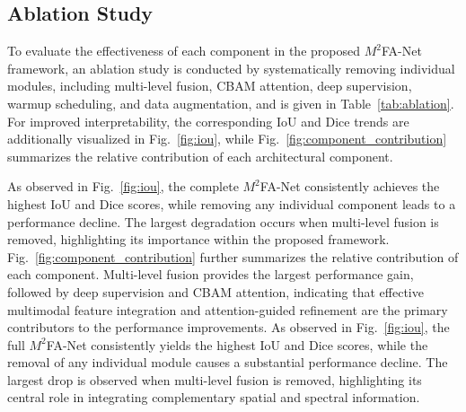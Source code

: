 \documentclass[pdflatex,sn-mathphys-num]{sn-jnl}
\begin{document}
\subsection{Ablation Study}
To evaluate the effectiveness of each component in the proposed $M^2$FA-Net framework, an ablation study is conducted by systematically removing individual modules, including multi-level fusion, CBAM attention, deep supervision, warmup scheduling, and data augmentation, and is given in Table~\ref{tab:ablation}. For improved interpretability, the corresponding IoU and Dice
trends are additionally visualized in Fig.~\ref{fig:iou}, while
Fig.~\ref{fig:component_contribution} summarizes the relative
contribution of each architectural component.

As observed in Fig.~\ref{fig:iou}, the complete $M^2$FA-Net consistently achieves the highest IoU and Dice scores, while removing any individual component leads to a performance decline. The largest degradation occurs when multi-level fusion is removed, highlighting its importance within the proposed framework. Fig.~\ref{fig:component_contribution} further summarizes the relative contribution of each component. Multi-level fusion provides the largest performance gain, followed by deep supervision and CBAM attention, indicating that effective multimodal feature integration and attention-guided refinement are the primary contributors to the performance improvements. As observed in Fig.~\ref{fig:iou}, the full $M^2$FA-Net consistently yields the highest IoU and Dice scores, while the removal of any individual module causes a substantial performance decline. The largest drop is observed when multi-level fusion is removed, highlighting its central role in integrating complementary spatial and spectral information.
\end{document}
